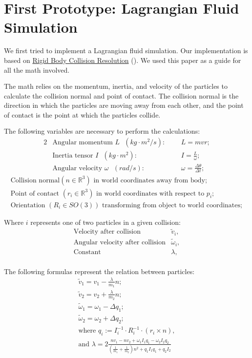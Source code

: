 \documentclass[a4paper,12pt,titlepage]{article}
\begin{document}
\pagebreak
\section{First Prototype: Lagrangian Fluid Simulation}
We first tried to implement a Lagrangian fluid simulation.
Our implementation is based on \hyperlink{http://www.hakenberg.de/diffgeo/collision_resolution.htm}{Rigid Body Collision Resolution}
(\cite{hakenberg}). We used this paper as a guide for all the math involved.

The math relies on the momentum, inertia, and velocity of the particles to
calculate the collision normal and point of contact. The collision normal is
the direction in which the particles are moving away from each other, and the
point of contact is the point at which the particles collide.

The following variables are necessary to perform the calculations:
\begin{alignat*}{2}
	& \text{Angular momentum $L$ } (kg\cdot m^2/s):\text{ } && L = mvr; \\
	& \text{Inertia tensor $I$ } (kg\cdot m^2): && I = \frac{L}{\omega}; \\
	& \text{Angular velocity $\omega$ } (rad/s): && \omega = \frac{\Delta \theta}{\Delta t};
\end{alignat*}
\[
	\begin{array}{l}
		\text{Collision normal} (n \in \mathbb{R}^3) \text{ in world coordinates away from body}; \\
		\text{Point of contact } (r_i \in \mathbb{R}^3) \text{ in world coordinates with respect to $p_i$}; \\
		\text{Orientation } (R_i \in SO(3)) \text{ transforming from object to world coordinates};
	\end{array}
\]

Where $i$ represents one of two particles in a given collision:
\[
\begin{array}{ll}
	\text{Velocity after collision} & \tilde{v}_i, \\ 
	\text{Angular velocity after collision} & \tilde{\omega}_i, \\
	\text{Constant} & \lambda, \\
\end{array}
\]

The following formulas represent the relation between particles:
\[
\begin{array}{cc}
	\tilde{v}_1 = v_1 - \frac{\lambda}{m_1} n; \\ 
	\tilde{v}_2 = v_2 + \frac{\lambda}{m_2} n; \\
	\tilde{\omega}_1 = \omega_1 - \Delta q_1; \\
	\tilde{\omega}_2 = \omega_2 + \Delta q_2; \\

	\text{where } q_i := I_i^{-1} \cdot R_i^{-1} \cdot (r_i\times n), \\
	\text{and } \lambda = 2 \frac{n v_1 - n v_2 + \omega_1 I_1 q_1 - \omega_2 I_2 q_2}
	{(\frac{1}{m_1} + \frac{1}{m_2})n^2 + q_1 I_1 q_1 + q_2 I_2} \\
\end{array}
\]
\end{document}
